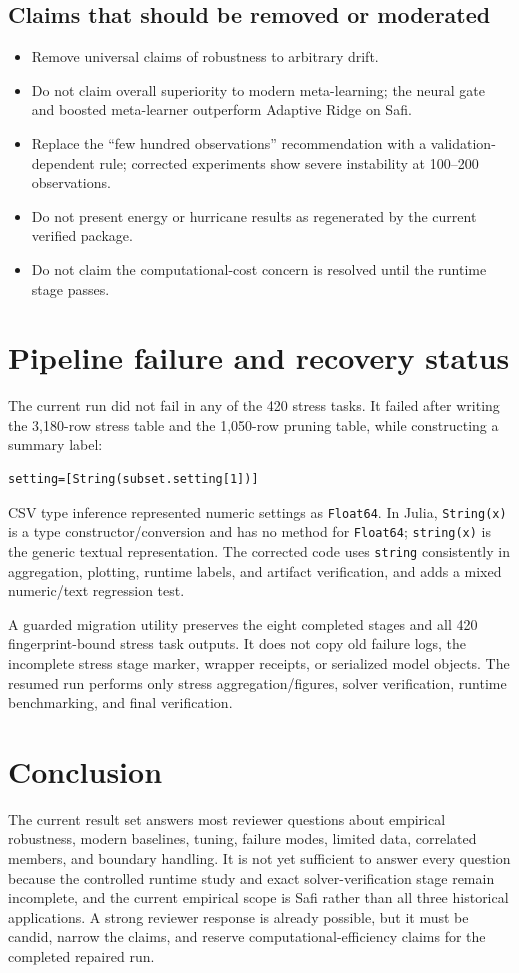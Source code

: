 \documentclass[10pt]{report}
\begin{document}
\section{Claims that should be removed or moderated}
\begin{itemize}
\item Remove universal claims of robustness to arbitrary drift.
\item Do not claim overall superiority to modern meta-learning; the neural gate and boosted meta-learner outperform Adaptive Ridge on Safi.
\item Replace the ``few hundred observations'' recommendation with a validation-dependent rule; corrected experiments show severe instability at 100--200 observations.
\item Do not present energy or hurricane results as regenerated by the current verified package.
\item Do not claim the computational-cost concern is resolved until the runtime stage passes.
\end{itemize}

\chapter{Pipeline failure and recovery status}
The current run did not fail in any of the 420 stress tasks. It failed after writing the 3,180-row stress table and the 1,050-row pruning table, while constructing a summary label:
\begin{verbatim}
setting=[String(subset.setting[1])]
\end{verbatim}
CSV type inference represented numeric settings as \texttt{Float64}. In Julia, \texttt{String(x)} is a type constructor/conversion and has no method for \texttt{Float64}; \texttt{string(x)} is the generic textual representation. The corrected code uses \texttt{string} consistently in aggregation, plotting, runtime labels, and artifact verification, and adds a mixed numeric/text regression test.

A guarded migration utility preserves the eight completed stages and all 420 fingerprint-bound stress task outputs. It does not copy old failure logs, the incomplete stress stage marker, wrapper receipts, or serialized model objects. The resumed run performs only stress aggregation/figures, solver verification, runtime benchmarking, and final verification.

\chapter{Conclusion}
The current result set answers most reviewer questions about empirical robustness, modern baselines, tuning, failure modes, limited data, correlated members, and boundary handling. It is not yet sufficient to answer every question because the controlled runtime study and exact solver-verification stage remain incomplete, and the current empirical scope is Safi rather than all three historical applications. A strong reviewer response is already possible, but it must be candid, narrow the claims, and reserve computational-efficiency claims for the completed repaired run.
\end{document}
